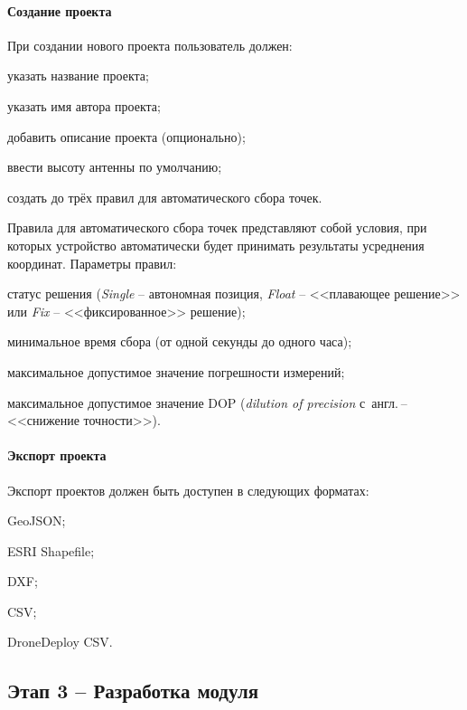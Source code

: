\documentclass[pta]{../../../../scs-iam}
\begin{document}
\paragraph{Создание проекта}

При создании нового проекта пользователь должен:
\begin{dashitemize}
  \item указать название проекта;
  \item указать имя автора проекта;
  \item добавить описание проекта (опционально);
  \item ввести высоту антенны по умолчанию;
  \item создать до трёх правил для автоматического сбора точек.
\end{dashitemize}

Правила для автоматического сбора точек представляют собой условия, при которых устройство автоматически будет принимать результаты усреднения координат. Параметры правил:
\begin{dashitemize}
  \item статус решения (\emph{Single} -- автономная позиция, \emph{Float} -- <<плавающее решение>> или \emph{Fix} -- <<фиксированное>> решение);
  \item минимальное время сбора (от одной секунды до одного часа);
  \item максимальное допустимое значение погрешности измерений;
  \item максимальное допустимое значение DOP (\emph{dilution of precision} с~англ. --<<снижение точности>>).
\end{dashitemize}

\paragraph{Экспорт проекта}

Экспорт проектов должен быть доступен в следующих форматах:
\begin{dashitemize}
  \item GeoJSON;
  \item ESRI Shapefile;
  \item DXF;
  \item CSV;
  \item DroneDeploy CSV.
\end{dashitemize}

\subsection{Этап 3 -- Разработка модуля}
\end{document}

